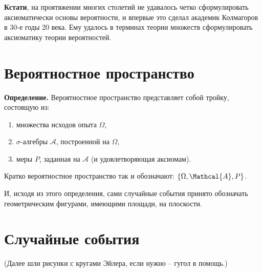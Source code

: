 \documentclass{article}
\begin{document}
\textbf{Кстати}, на проятяжении многих столетий не удавалось четко сформулировать аксиоматически основы вероятности, и впервые это сделал академик Колмагоров в 30-е годы 20 века. Ему удалось в терминах теории множеств сформулировать аксиоматику теории вероятностей.

\section{Вероятностное пространство}

\textbf{Определение.} Вероятностное пространство представляет собой тройку, состоящую из:

\begin{enumerate}
\item множества исходов опыта $\Omega$,

\item $\sigma$-алгебры $\mathcal{A}$, построенной на $\Omega$,

\item меры $P$, заданная на $\mathcal{A}$ (и удовлетворяющая аксиомам).
\end{enumerate}

Кратко вероятностное пространство так и обозначают: $\{\Omega, \Mathcal{A}, P\}$.

И, исходя из этого определения, сами случайные события принято обозначать геометрическим фигурами, имеющими площади, на плоскости.

\section{Случайные события}

(Далее шли рисунки с кругами Эйлера, если нужно -- гугол в помощь.)
\end{document}
